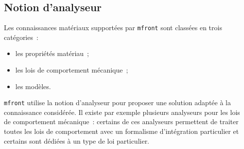 \documentclass[rectoverso,pleiades,pstricks,leqno,anti]{texmf/note_technique_2010}
\newcommand{\mfront}{\texttt{mfront}}
\begin{document}
\subsection{Notion d'analyseur}
\label{sec:mfront:parser}

Les connaissances matériaux supportées par \mfront{} sont classées en
trois catégories~:
\begin{itemize}
  \item les propriétés matériau~;
  \item les lois de comportement mécanique~;
  \item les modèles.
\end{itemize}

\mfront{} utilise la notion d'analyseur pour proposer une solution
adaptée à la connaissance considérée. Il existe par exemple plusieurs
analyseurs pour les lois de comportement mécanique~: certains de ces
analyseurs permettent de traiter toutes les lois de comportement avec un
formalisme d'intégration particulier et certains sont dédiées à un type
de loi particulier.
\end{document}
